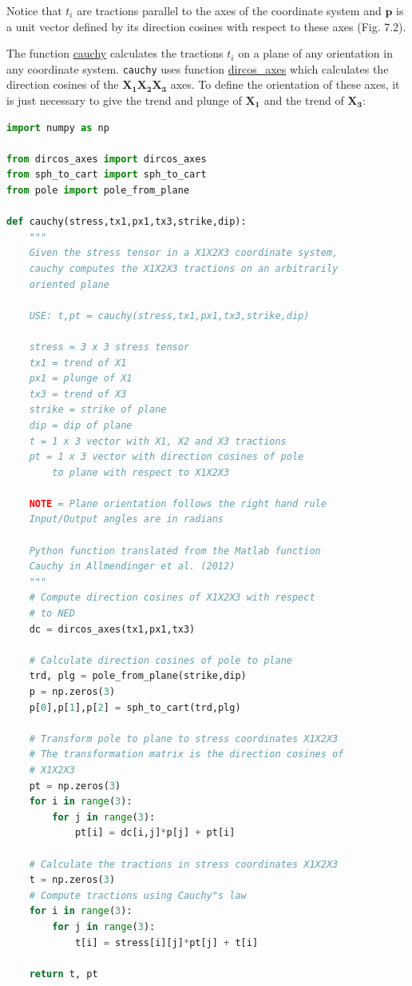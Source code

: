\documentclass[a4paper , 12pt]{book}
\newcommand{\code}[1]{\colorbox{light-gray}{\texttt{#1}}}
\begin{document}
Notice that $t_i$ are tractions parallel to the axes of the coordinate system and $\mathbf{p}$ is a unit vector defined by its direction cosines with respect to these axes (Fig. 7.2).

The function \href{https://github.com/nfcd/compGeo/blob/master/source/functions/cauchy.py}{cauchy} calculates the tractions $t_i$ on a plane of any orientation in any coordinate system. \code{cauchy} uses function \href{https://github.com/nfcd/compGeo/blob/master/source/functions/dircos_axes.py}{dircos\_axes} which calculates the direction cosines of the $\mathbf{X_1X_2X_3}$ axes. To define the orientation of these axes, it is just necessary to give the trend and plunge of $\mathbf{X_1}$ and the trend of $\mathbf{X_3}$:

\begin{center}
\begin{lstlisting}[language=Python, frame=single]
import numpy as np

from dircos_axes import dircos_axes
from sph_to_cart import sph_to_cart
from pole import pole_from_plane

def cauchy(stress,tx1,px1,tx3,strike,dip):
	"""
	Given the stress tensor in a X1X2X3 coordinate system,
	cauchy computes the X1X2X3 tractions on an arbitrarily
	oriented plane 
	
	USE: t,pt = cauchy(stress,tx1,px1,tx3,strike,dip)
	
	stress = 3 x 3 stress tensor
	tx1 = trend of X1
	px1 = plunge of X1
	tx3 = trend of X3
	strike = strike of plane
	dip = dip of plane
	t = 1 x 3 vector with X1, X2 and X3 tractions
	pt = 1 x 3 vector with direction cosines of pole
		to plane with respect to X1X2X3
	
	NOTE = Plane orientation follows the right hand rule
	Input/Output angles are in radians
	
	Python function translated from the Matlab function
	Cauchy in Allmendinger et al. (2012)
	"""
	# Compute direction cosines of X1X2X3 with respect
	# to NED
	dc = dircos_axes(tx1,px1,tx3)
	
	# Calculate direction cosines of pole to plane
	trd, plg = pole_from_plane(strike,dip)
	p = np.zeros(3)
	p[0],p[1],p[2] = sph_to_cart(trd,plg)
	
	# Transform pole to plane to stress coordinates X1X2X3
	# The transformation matrix is the direction cosines of
	# X1X2X3
	pt = np.zeros(3)
	for i in range(3):
		for j in range(3):
			pt[i] = dc[i,j]*p[j] + pt[i]
			
	# Calculate the tractions in stress coordinates X1X2X3
	t = np.zeros(3)
	# Compute tractions using Cauchy"s law
	for i in range(3):
		for j in range(3):
			t[i] = stress[i][j]*pt[j] + t[i]
	
	return t, pt
\end{lstlisting}
\end{center}
\end{document}
